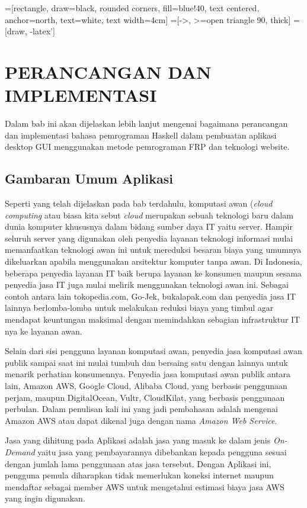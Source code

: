 \documentclass[pi.tex]{subfile}
\begin{document}
=[rectangle, draw=black, rounded corners, fill=blue!40,
        text centered, anchor=north, text=white, text width=4cm]
=[->, >=open triangle 90, thick]
 = [draw, -latex']

\chapter{PERANCANGAN DAN IMPLEMENTASI}
Dalam bab ini akan dijelaskan lebih lanjut mengenai bagaimana perancangan dan implementasi bahasa pemrograman Haskell dalam pembuatan aplikasi desktop GUI menggunakan metode pemrograman FRP dan teknologi website.

\section{Gambaran Umum Aplikasi}
Seperti yang telah dijelaskan pada bab terdahulu, komputasi awan (\emph{cloud computing} atau biasa kita sebut \emph{cloud}  merupakan sebuah teknologi baru dalam dunia komputer khususnya dalam bidang sumber daya IT yaitu server. Hampir seluruh server yang digunakan oleh penyedia layanan teknologi informasi mulai memanfaatkan teknologi awan ini untuk mereduksi besaran biaya yang umumnya dikeluarkan apabila menggunakan arsitektur komputer tanpa awan. Di Indonesia, beberapa penyedia layanan IT baik berupa layanan ke konsumen maupun sesama penyedia jasa IT juga mulai melirik menggunakan teknologi awan ini. Sebagai contoh antara lain tokopedia.com, Go-Jek, bukalapak.com dan penyedia jasa IT lainnya berlomba-lomba untuk melakukan reduksi biaya yang timbul agar mendapat keuntungan maksimal dengan memindahkan sebagian infrastruktur IT nya ke layanan awan.

Selain dari sisi pengguna layanan komputasi awan, penyedia jasa komputasi awan publik sampai saat ini mulai tumbuh dan bersaing satu dengan lainnya untuk menarik perhatian konsumennya. Penyedia jasa komputasi awan publik antara lain, Amazon AWS, Google Cloud, Alibaba Cloud, yang berbasis penggunaan perjam, maupun DigitalOcean, Vultr, CloudKilat, yang berbasis penggunaan perbulan. Dalam penulisan kali ini yang jadi pembahasan adalah mengenai Amazon AWS atau dapat dikenal juga dengan nama \emph{Amazon Web Service}.

Jasa yang dihitung pada Aplikasi adalah jasa yang masuk ke dalam jenis \emph{On-Demand} yaitu jasa yang pembayarannya dibebankan kepada pengguna sesuai dengan jumlah lama penggunaan atas jasa tersebut. Dengan Aplikasi ini, pengguna pemula diharapkan tidak memerlukan koneksi internet maupun mendaftar sebagai member AWS untuk mengetahui estimasi biaya jasa AWS yang ingin digunakan.
\end{document}
